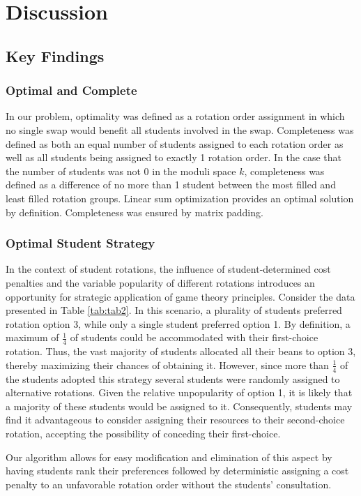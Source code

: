 \documentclass{article}
\begin{document}
\section{Discussion}
\label{sec:disc}
\subsection{Key Findings}
\subsubsection{Optimal and Complete}
In our problem, optimality was defined as a rotation order assignment in which no single swap would benefit all students involved in the swap. Completeness was defined as both an equal number of students assigned to each rotation order as well as all students being assigned to exactly 1 rotation order. In the case that the number of students was not $0$ in the moduli space $k$, completeness was defined as a difference of no more than 1 student between the most filled and least filled rotation groups. Linear sum optimization provides an optimal solution by definition. Completeness was ensured by matrix padding.

\subsubsection{Optimal Student Strategy}
In the context of student rotations, the influence of student-determined cost penalties and the variable popularity of different rotations introduces an opportunity for strategic application of game theory principles. Consider the data presented in Table \ref{tab:tab2}. In this scenario, a plurality of students preferred rotation option 3, while only a single student preferred option 1. By definition, a maximum of $\frac{1}{4}$ of students could be accommodated with their first-choice rotation. Thus, the vast majority of students allocated all their beans to option 3, thereby maximizing their chances of obtaining it. However, since more than $\frac{1}{4}$ of the students adopted this strategy several students were randomly assigned to alternative rotations. Given the relative unpopularity of option 1, it is likely that a majority of these students would be assigned to it. Consequently, students may find it advantageous to consider assigning their resources to their second-choice rotation, accepting the possibility of conceding their first-choice.

Our algorithm allows for easy modification and elimination of this aspect by having students rank their preferences followed by deterministic assigning a cost penalty to an unfavorable rotation order without the students' consultation. 
\end{document}
